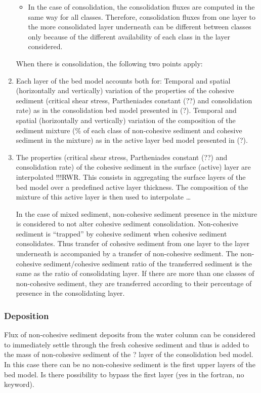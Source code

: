 \begin{enumerate}
\begin{itemize}
    \item In the case of consolidation, the consolidation fluxes are computed in the same way for all classes. Therefore, consolidation fluxes from one layer to the more consolidated layer underneath can be different between classes only because of the different availability of each class in the layer considered.
  \end{itemize}
When there is consolidation, the following two points apply:
\item Each layer of the bed model accounts both for:
	Temporal and spatial (horizontally and vertically) variation of the properties of the cohesive sediment (critical shear stress, Partheniades constant (??) and consolidation rate) as in the consolidation bed model presented in (?).
	Temporal and spatial (horizontally and vertically) variation of the composition of the sediment mixture (\% of each class of non-cohesive sediment and cohesive sediment in the mixture) as in the active layer bed model presented in (?).
\item The properties (critical shear stress, Partheniades constant (??) and consolidation rate) of the cohesive sediment in the surface (active) layer are interpolated !!!RWR. This consists in aggregating the surface layers of the bed model over a predefined active layer thickness. The composition of the mixture of this active layer is then used to interpolate …

  In the case of mixed sediment, non-cohesive sediment presence in the mixture is considered to not alter cohesive sediment consolidation. Non-cohesive sediment is ``trapped'' by cohesive sediment when cohesive sediment consolidates. Thus transfer of cohesive sediment from one layer to the layer underneath is accompanied by a transfer of non-cohesive sediment. The non-cohesive sediment/cohesive sediment ratio of the transferred sediment is the same as the ratio of consolidating layer. If there are more than one classes of non-cohesive sediment, they are transferred according to their percentage of presence in the consolidating layer.
\end{enumerate}

\subsubsection{Deposition}
Flux of non-cohesive sediment deposits from the water column can be considered to immediately settle through the fresh cohesive sediment and thus is added to the mass of non-cohesive sediment of the ? layer of the consolidation bed model. In this case there can be no non-cohesive sediment is the first upper layers of the bed model. Is there possibility to bypass the first layer (yes in the fortran, no keyword).


